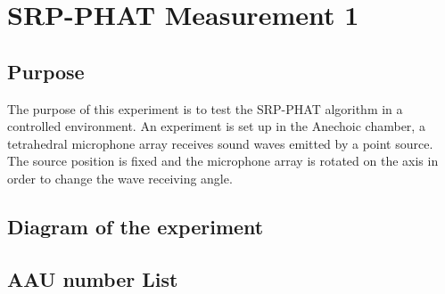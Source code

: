 \section{SRP-PHAT Measurement 1}

\subsection{Purpose}

The purpose of this experiment is to test the SRP-PHAT algorithm in a controlled environment. An experiment is set up in the Anechoic chamber, a tetrahedral microphone array receives sound waves emitted by a point source. The source position is fixed and the microphone array is rotated on the axis in order to change the wave receiving angle.

\subsection{Diagram of the experiment}



\subsection{AAU number List}

